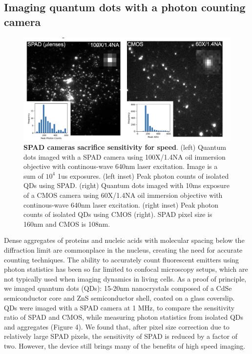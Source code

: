 \documentclass{ucetd}
\begin{document}
\subsection{Imaging quantum dots with a photon counting camera}

\begin{figure}
\begin{center}
\includegraphics[width=15cm]{SPADvCMOS.png}
\end{center}
\caption{\textbf{SPAD cameras sacrifice sensitivity for speed}. (left) Quantum dots imaged with a SPAD camera using 100X/1.4NA oil immersion objective with continous-wave 640nm laser excitation. Image is a sum of $10^{4}$ 1us exposures. (left inset) Peak photon counts of isolated QDs using SPAD. (right) Quantum dots imaged with 10ms exposure of a CMOS camera using 60X/1.4NA oil immersion objective with continous-wave 640nm laser excitation. (right inset) Peak photon counts of isolated QDs using CMOS (right). SPAD pixel size is 160nm and CMOS is 108nm.}
\end{figure}


Dense aggregates of proteins and nucleic acids with molecular spacing below the diffraction limit are commonplace in the nucleus, creating the need for accurate counting techniques. The ability to accurately count fluorescent emitters using photon statistics has been so far limited to confocal microscopy setups, which are not typically used when imaging dynamics in living cells. As a proof of principle, we imaged quantum dots (QDs): 15-20nm nanocrystals composed of a CdSe semiconductor core and ZnS semiconductor shell, coated on a glass coverslip. QDs were imaged with a SPAD camera at 1 MHz, to compare the sensitivity ratio of SPAD and CMOS, while measuring photon statistics from isolated QDs and aggregates (Figure 4). We found that, after pixel size correction due to relatively large SPAD pixels, the sensitivity of SPAD is reduced by a factor of two. However, the device still brings many of the benefits of high speed imaging.
\end{document}
